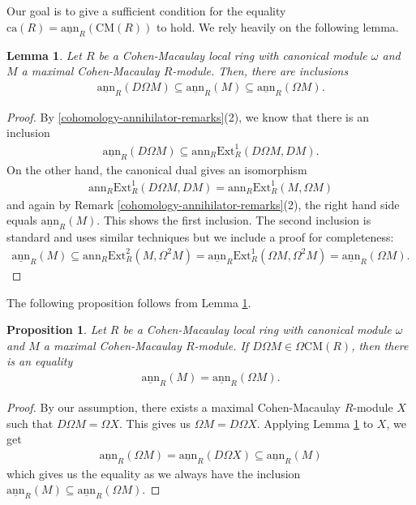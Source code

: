 \documentclass[12pt]{amsart}
\newcommand{\Ext}{\mathrm{Ext}}
\newcommand{\ann}{\mathrm{ann}}
\newcommand{\sann}{\underline{\mathrm{ann}}}
\newcommand\ca{\mathrm{ca}}
\newcommand{\CM}{\mathrm{CM}}
\newtheorem{lemma}[theorem]{Lemma}
\newtheorem{proposition}[theorem]{Proposition}
\theoremstyle{definition}
\numberwithin{equation}{theorem}
\begin{document}
Our goal is to give a sufficient condition for the equality $\ca(R) = \sann_R(\CM(R))$ to hold. We rely heavily on the following lemma.
\begin{lemma}\label{main-lemma}
    Let $R$ be a Cohen-Macaulay local ring with canonical module $\omega$ and $M$ a maximal Cohen-Macaulay $R$-module. Then, there are inclusions 
    \begin{align*}
    \sann_R(D\Omega M) \subseteq \sann_R(M) \subseteq \sann_R(\Omega M).
    \end{align*}
\end{lemma}
\begin{proof}
    By \ref{cohomology-annihilator-remarks}(2), we know that there is an inclusion 
    \begin{align*}
    \sann_R(D\Omega M) \subseteq \ann_R \Ext_R^1(D\Omega M, DM).
    \end{align*}
    On the other hand, the canonical dual gives an isomorphism 
    \begin{align*}
        \ann_R \Ext_R^1(D\Omega M, DM) = \ann_R \Ext_R^1(M, \Omega M)
    \end{align*}
    and again by Remark \ref{cohomology-annihilator-remarks}(2), the right hand side equals $\sann_R(M)$. This shows the first inclusion. The second inclusion is standard and uses similar techniques but we include a proof for completeness: 
    \begin{align*}
    \sann_R(M) \subseteq \ann_R\Ext_R^2(M, \Omega^2M) = \sann_R\Ext_R^1(\Omega M, \Omega^2 M) = \sann_R(\Omega M).
    \end{align*}
\end{proof}
The following proposition follows from Lemma \ref{main-lemma}.
\begin{proposition}\label{main-proposition}
    Let $R$ be a Cohen-Macaulay local ring with canonical module $\omega$ and $M$ a maximal Cohen-Macaulay $R$-module. If $D\Omega M \in \Omega \CM(R)$, then there is an equality 
    \begin{align*}
    \sann_R(M) = \sann_R(\Omega M).
    \end{align*}
\end{proposition}
\begin{proof}
    By our assumption, there exists a maximal Cohen-Macaulay $R$-module $X$ such that $D\Omega M = \Omega X$. This gives us $\Omega M = D\Omega X$. Applying Lemma \ref{main-lemma} to $X$, we get 
    \begin{align*}
    \sann_R(\Omega M) = \sann_R(D \Omega X) \subseteq \sann_R(M)
    \end{align*}
    which gives us the equality as we always have the inclusion $\sann_R(M) \subseteq \sann_R(\Omega M)$.
\end{proof}
\end{document}
